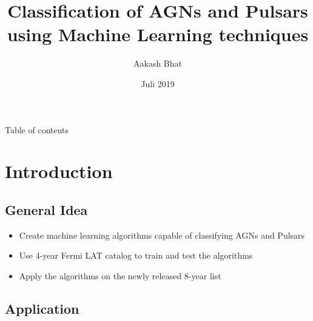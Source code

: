 \documentclass{beamer}
\title[MMA] %
{Classification of AGNs and Pulsars using Machine Learning techniques }
\author{Aakash Bhat}%
\institute %
{
 FAU Erlangen-Nurnberg
}
\date{Juli 2019} %
\begin{document}
\begin{frame}
  \titlepage
\end{frame}

\begin{frame}{Table of contents}
  \tableofcontents
\end{frame}





\section{Introduction}

\subsection{General Idea}

\begin{frame}

  \begin{itemize}
  \item
Create machine learning algorithms capable of classifying AGNs and Pulsars
  \item
   Use 4-year Fermi LAT catalog to train and test the algorithms
  \item
Apply the algorithms on the newly released 8-year list

  \end{itemize}
\end{frame}


\subsection{Application}
\end{document}
